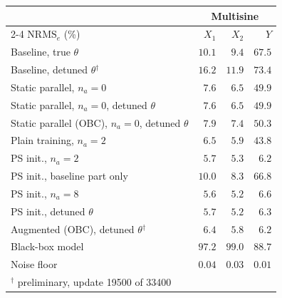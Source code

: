 \setlength{\tabcolsep}{3pt}
\begin{tabular}{l r r r}
\toprule
 & \multicolumn{3}{c}{Multisine}\\
\cmidrule(lr){2-4}
$\mathrm{NRMS}_e$ (\%) & $X_1$ & $X_2$ & $Y$\\
\midrule
Baseline, true $\theta$ & $10.1$ & $9.4$ & $67.5$\\
Baseline, detuned $\theta$$^\dagger$ & $16.2$ & $11.9$ & $73.4$\\
Static parallel, $n_a{=}0$ & $7.6$ & $6.5$ & $49.9$\\
Static parallel, $n_a{=}0$, detuned $\theta$ & $7.6$ & $6.5$ & $49.9$\\
Static parallel (OBC), $n_a{=}0$, detuned $\theta$ & $7.9$ & $7.4$ & $50.3$\\
Plain training, $n_a{=}2$ & $6.5$ & $5.9$ & $43.8$\\
PS init., $n_a{=}2$ & $5.7$ & $5.3$ & $6.2$\\
PS init., baseline part only & $10.0$ & $8.3$ & $66.8$\\
PS init., $n_a{=}8$ & $5.6$ & $5.2$ & $6.6$\\
PS init., detuned $\theta$ & $5.7$ & $5.2$ & $6.3$\\
\midrule
Augmented (OBC), detuned $\theta$$^\dagger$ & $6.4$ & $5.8$ & $6.2$\\
\midrule
Black-box model & $97.2$ & $99.0$ & $88.7$\\
\midrule
Noise floor & $0.04$ & $0.03$ & $0.01$\\
\bottomrule
\multicolumn{4}{l}{\footnotesize $^\dagger$ preliminary, update 19500 of 33400}\\
\end{tabular}
